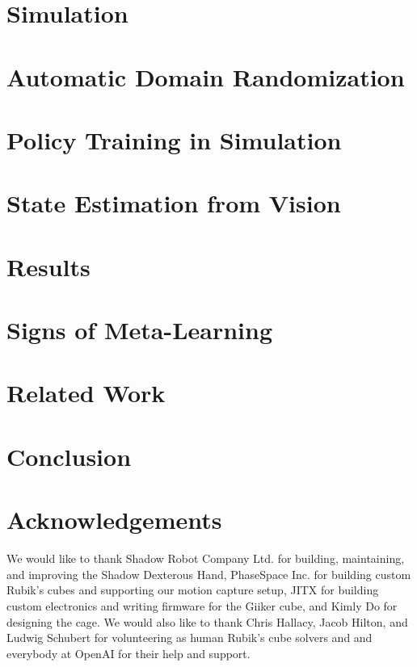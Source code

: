\documentclass{article}
\begin{document}
\section{Simulation}
\label{sec:sim}


\section{Automatic Domain Randomization}
\label{sec:adr}


\section{Policy Training in Simulation}
\label{sec:policy}


\section{State Estimation from Vision}
\label{sec:vision}


\section{Results}
\label{sec:exp-adr}



\section{Signs of Meta-Learning}
\label{sec:exp-meta}


\section{Related Work}
\label{sec:related}


\section{Conclusion}
\label{sec:conclusion}


\section*{Acknowledgements}
We would like to thank Shadow Robot Company Ltd. for building, maintaining, and improving the Shadow Dexterous Hand, PhaseSpace Inc. for building custom Rubik's cubes and supporting our motion capture setup, JITX for building custom electronics and writing firmware for the Giiker cube, and Kimly Do for designing the cage. We would also like to thank Chris Hallacy, Jacob Hilton, and Ludwig Schubert for volunteering as human Rubik's cube solvers and and everybody at OpenAI for their help and support.
\end{document}
